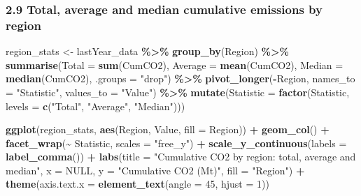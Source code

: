 \documentclass[
]{article}
\newenvironment{Shaded}{\begin{snugshade}}{\end{snugshade}}
\newcommand{\AttributeTok}[1]{\textcolor[rgb]{0.13,0.29,0.53}{#1}}
\newcommand{\ConstantTok}[1]{\textcolor[rgb]{0.56,0.35,0.01}{#1}}
\newcommand{\DecValTok}[1]{\textcolor[rgb]{0.00,0.00,0.81}{#1}}
\newcommand{\FunctionTok}[1]{\textcolor[rgb]{0.13,0.29,0.53}{\textbf{#1}}}
\newcommand{\NormalTok}[1]{#1}
\newcommand{\OtherTok}[1]{\textcolor[rgb]{0.56,0.35,0.01}{#1}}
\newcommand{\SpecialCharTok}[1]{\textcolor[rgb]{0.81,0.36,0.00}{\textbf{#1}}}
\newcommand{\StringTok}[1]{\textcolor[rgb]{0.31,0.60,0.02}{#1}}
\begin{document}
\subsubsection{2.9 Total, average and median cumulative emissions by
region}\label{total-average-and-median-cumulative-emissions-by-region}

\begin{Shaded}
\begin{Highlighting}[]
\NormalTok{region\_stats }\OtherTok{\textless{}{-}}\NormalTok{ lastYear\_data }\SpecialCharTok{\%\textgreater{}\%}
  \FunctionTok{group\_by}\NormalTok{(Region) }\SpecialCharTok{\%\textgreater{}\%}
  \FunctionTok{summarise}\NormalTok{(}\AttributeTok{Total =} \FunctionTok{sum}\NormalTok{(CumCO2), }\AttributeTok{Average =} \FunctionTok{mean}\NormalTok{(CumCO2),}
            \AttributeTok{Median =} \FunctionTok{median}\NormalTok{(CumCO2), }\AttributeTok{.groups =} \StringTok{"drop"}\NormalTok{) }\SpecialCharTok{\%\textgreater{}\%}
  \FunctionTok{pivot\_longer}\NormalTok{(}\SpecialCharTok{{-}}\NormalTok{Region, }\AttributeTok{names\_to =} \StringTok{"Statistic"}\NormalTok{, }\AttributeTok{values\_to =} \StringTok{"Value"}\NormalTok{) }\SpecialCharTok{\%\textgreater{}\%}
  \FunctionTok{mutate}\NormalTok{(}\AttributeTok{Statistic =} \FunctionTok{factor}\NormalTok{(Statistic,}
                            \AttributeTok{levels =} \FunctionTok{c}\NormalTok{(}\StringTok{"Total"}\NormalTok{, }\StringTok{"Average"}\NormalTok{, }\StringTok{"Median"}\NormalTok{)))}

\FunctionTok{ggplot}\NormalTok{(region\_stats, }\FunctionTok{aes}\NormalTok{(Region, Value, }\AttributeTok{fill =}\NormalTok{ Region)) }\SpecialCharTok{+}
  \FunctionTok{geom\_col}\NormalTok{() }\SpecialCharTok{+}
  \FunctionTok{facet\_wrap}\NormalTok{(}\SpecialCharTok{\textasciitilde{}}\NormalTok{ Statistic, }\AttributeTok{scales =} \StringTok{"free\_y"}\NormalTok{) }\SpecialCharTok{+}
  \FunctionTok{scale\_y\_continuous}\NormalTok{(}\AttributeTok{labels =} \FunctionTok{label\_comma}\NormalTok{()) }\SpecialCharTok{+}
  \FunctionTok{labs}\NormalTok{(}\AttributeTok{title =} \StringTok{"Cumulative CO2 by region: total, average and median"}\NormalTok{,}
       \AttributeTok{x =} \ConstantTok{NULL}\NormalTok{, }\AttributeTok{y =} \StringTok{"Cumulative CO2 (Mt)"}\NormalTok{, }\AttributeTok{fill =} \StringTok{"Region"}\NormalTok{) }\SpecialCharTok{+}
  \FunctionTok{theme}\NormalTok{(}\AttributeTok{axis.text.x =} \FunctionTok{element\_text}\NormalTok{(}\AttributeTok{angle =} \DecValTok{45}\NormalTok{, }\AttributeTok{hjust =} \DecValTok{1}\NormalTok{))}
\end{Highlighting}
\end{Shaded}
\end{document}
